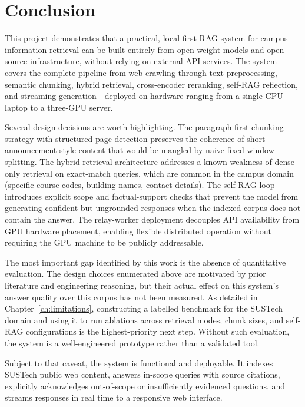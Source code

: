 \chapter{Conclusion}

This project demonstrates that a practical, local-first RAG system for campus information retrieval can be built entirely from open-weight models and open-source infrastructure, without relying on external API services. The system covers the complete pipeline from web crawling through text preprocessing, semantic chunking, hybrid retrieval, cross-encoder reranking, self-RAG reflection, and streaming generation---deployed on hardware ranging from a single CPU laptop to a three-GPU server.

Several design decisions are worth highlighting. The paragraph-first chunking strategy with structured-page detection preserves the coherence of short announcement-style content that would be mangled by naive fixed-window splitting. The hybrid retrieval architecture addresses a known weakness of dense-only retrieval on exact-match queries, which are common in the campus domain (specific course codes, building names, contact details). The self-RAG loop introduces explicit scope and factual-support checks that prevent the model from generating confident but ungrounded responses when the indexed corpus does not contain the answer. The relay-worker deployment decouples API availability from GPU hardware placement, enabling flexible distributed operation without requiring the GPU machine to be publicly addressable.

The most important gap identified by this work is the absence of quantitative evaluation. The design choices enumerated above are motivated by prior literature and engineering reasoning, but their actual effect on this system's answer quality over this corpus has not been measured. As detailed in Chapter~\ref{ch:limitations}, constructing a labelled benchmark for the SUSTech domain and using it to run ablations across retrieval modes, chunk sizes, and self-RAG configurations is the highest-priority next step. Without such evaluation, the system is a well-engineered prototype rather than a validated tool.

Subject to that caveat, the system is functional and deployable. It indexes SUSTech public web content, answers in-scope queries with source citations, explicitly acknowledges out-of-scope or insufficiently evidenced questions, and streams responses in real time to a responsive web interface.
